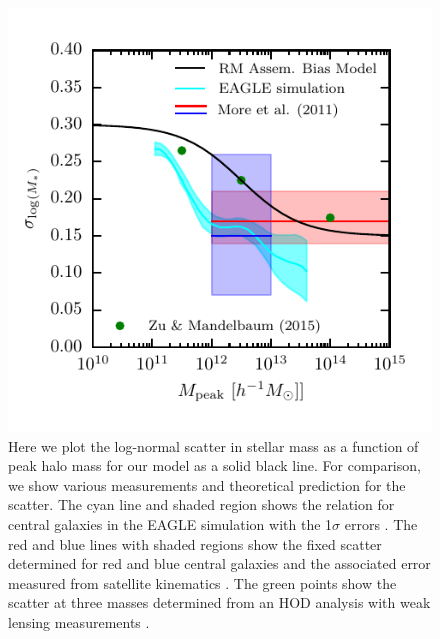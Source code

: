 \documentclass[useAMS,fleqn,usenatbib]{mnras}
\begin{document}
\begin{figure}
    \includegraphics[width=\columnwidth]{figures/scatter_model.pdf}
    \caption{Here we plot the log-normal scatter in stellar mass as a function of peak halo mass for our model as a solid black line.  For comparison, we show various measurements and theoretical prediction for the scatter.  The cyan line and shaded region shows the relation for central galaxies in the EAGLE simulation with the 1$\sigma$ errors \citep{Matthee:2016vm}.  The red and blue lines with shaded regions show the fixed scatter determined for red and blue central galaxies and the associated error measured from satellite kinematics \citep{More:2011il}.  The green points show the scatter at three masses determined from an HOD analysis with weak lensing measurements \citep{Zu:2015vh}.}
    \label{fig:scatter_model}
\end{figure}
\end{document}
